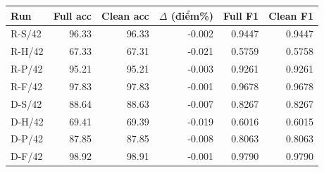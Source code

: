 \begin{tabular}{lrrrrr}
\toprule
Run & Full acc & Clean acc & $\Delta$ (điểm\%) & Full F1 & Clean F1\\
\midrule
R-S/42 & 96.33 & 96.33 & -0.002 & 0.9447 & 0.9447\\
R-H/42 & 67.33 & 67.31 & -0.021 & 0.5759 & 0.5758\\
R-P/42 & 95.21 & 95.21 & -0.003 & 0.9261 & 0.9261\\
R-F/42 & 97.83 & 97.83 & -0.001 & 0.9678 & 0.9678\\
D-S/42 & 88.64 & 88.63 & -0.007 & 0.8267 & 0.8267\\
D-H/42 & 69.41 & 69.39 & -0.019 & 0.6016 & 0.6015\\
D-P/42 & 87.85 & 87.85 & -0.008 & 0.8063 & 0.8063\\
D-F/42 & 98.92 & 98.91 & -0.001 & 0.9790 & 0.9790\\
\bottomrule
\end{tabular}
